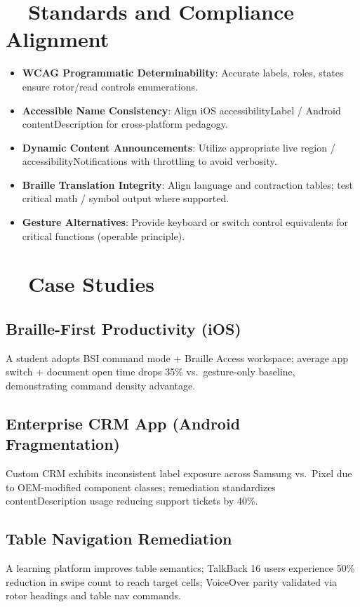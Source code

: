 \section{~~Standards and Compliance Alignment}
\label{sec:sr26-standards}
\begin{itemize}
	\item \textbf{WCAG Programmatic Determinability}: Accurate labels, roles, states ensure rotor/read controls enumerations.
	\item \textbf{Accessible Name Consistency}: Align iOS accessibilityLabel / Android contentDescription for cross-platform pedagogy.
	\item \textbf{Dynamic Content Announcements}: Utilize appropriate live region / accessibilityNotifications with throttling to avoid verbosity.
	\item \textbf{Braille Translation Integrity}: Align language and contraction tables; test critical math / symbol output where supported.
	\item \textbf{Gesture Alternatives}: Provide keyboard or switch control equivalents for critical functions (operable principle).
\end{itemize}

\section{~~Case Studies}
\label{sec:sr26-case-studies}
\subsection*{Braille-First Productivity (iOS)}
A student adopts BSI command mode + Braille Access workspace; average app switch + document open time drops 35\% vs.\ gesture-only baseline, demonstrating command density advantage.

\subsection*{Enterprise CRM App (Android Fragmentation)}
Custom CRM exhibits inconsistent label exposure across Samsung vs.\ Pixel due to OEM-modified component classes; remediation standardizes contentDescription usage reducing support tickets by 40\%.

\subsection*{Table Navigation Remediation}
A learning platform improves table semantics; TalkBack 16 users experience 50\% reduction in swipe count to reach target cells; VoiceOver parity validated via rotor headings and table nav commands.

